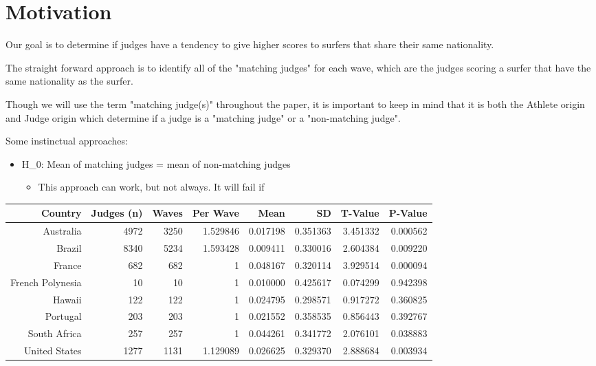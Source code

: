 \documentclass[12pt,a4paper]{article}
\begin{document}
\section{Motivation}
Our goal is to determine if judges have a tendency to give higher scores to surfers that share their same nationality.


The straight forward approach is to identify all of the "matching judges" for each wave, which are the judges scoring a surfer that have the same nationality as the surfer. 


Though we will use the term "matching judge(s)" throughout the paper, it is important to keep in mind that it is both the Athlete origin and Judge origin which determine if a judge is a "matching judge" or a "non-matching judge".


Some instinctual approaches:

\begin{itemize}
\item H\_0: Mean of matching judges = mean of non-matching judges

\begin{itemize}
\item This approach can work, but not always. It will fail if 

\end{itemize}
\end{itemize}

\begin{tabular}
{r | r | r | r | r | r | r | r}
Country & Judges (n) & Waves & Per Wave & Mean & SD & T-Value & P-Value \\
\hline
Australia & 4972 & 3250 & 1.529846 & 0.017198 & 0.351363 & 3.451332 & 0.000562 \\
Brazil & 8340 & 5234 & 1.593428 & 0.009411 & 0.330016 & 2.604384 & 0.009220 \\
France & 682 & 682 & 1 & 0.048167 & 0.320114 & 3.929514 & 0.000094 \\
French Polynesia & 10 & 10 & 1 & 0.010000 & 0.425617 & 0.074299 & 0.942398 \\
Hawaii & 122 & 122 & 1 & 0.024795 & 0.298571 & 0.917272 & 0.360825 \\
Portugal & 203 & 203 & 1 & 0.021552 & 0.358535 & 0.856443 & 0.392767 \\
South Africa & 257 & 257 & 1 & 0.044261 & 0.341772 & 2.076101 & 0.038883 \\
United States & 1277 & 1131 & 1.129089 & 0.026625 & 0.329370 & 2.888684 & 0.003934 \\
\end{tabular}
\end{document}
